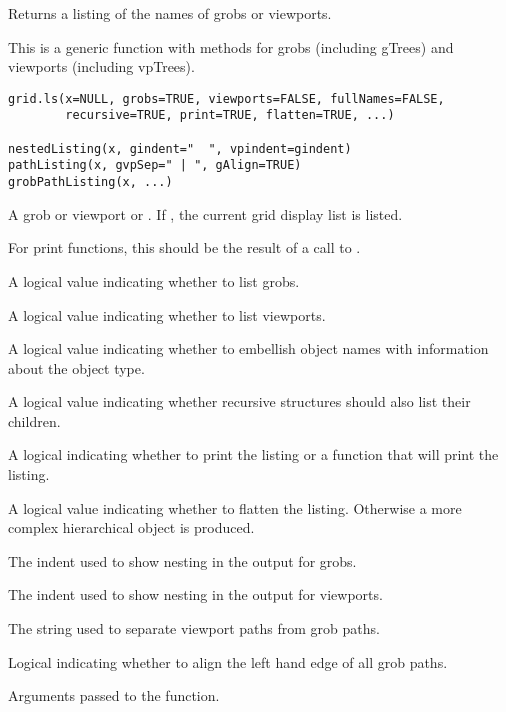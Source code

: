 %
\begin{Description}\relax
Returns a listing of the names of grobs or viewports.

This is a generic function with methods for grobs (including
gTrees) and viewports (including vpTrees).
\end{Description}
%
\begin{Usage}
\begin{verbatim}
grid.ls(x=NULL, grobs=TRUE, viewports=FALSE, fullNames=FALSE,
        recursive=TRUE, print=TRUE, flatten=TRUE, ...)

nestedListing(x, gindent="  ", vpindent=gindent) 
pathListing(x, gvpSep=" | ", gAlign=TRUE) 
grobPathListing(x, ...) 
\end{verbatim}
\end{Usage}
%
\begin{Arguments}
\begin{ldescription}
\item[\code{x}] A grob or viewport or .  If , the current
grid display list is listed.

For print functions, this should be the result of a call to
.
\item[\code{grobs}] A logical value indicating whether to list grobs.
\item[\code{viewports}] A logical value indicating whether to list
viewports.
\item[\code{fullNames}] A logical value indicating whether to embellish
object names with information about the object type.
\item[\code{recursive}] A logical value indicating whether recursive
structures should also list their children.
\item[\code{print}] A logical indicating whether to print the listing
or a function that will print the listing.
\item[\code{flatten}] A logical value indicating whether to flatten
the listing.  Otherwise a more complex hierarchical object is
produced.
\item[\code{gindent}] The indent used to show nesting in the output for
grobs.
\item[\code{vpindent}] The indent used to show nesting in the output for
viewports.
\item[\code{gvpSep}] The string used to separate viewport paths from grob
paths.
\item[\code{gAlign}] Logical indicating whether to align the left hand
edge of all grob paths.
\item[\code{...}] Arguments passed to the  function.
\end{ldescription}
\end{Arguments}
